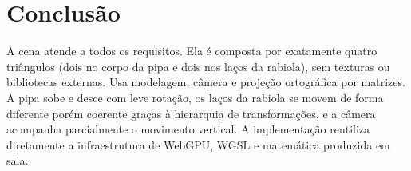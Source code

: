 \documentclass[11pt,a4paper]{article}
\begin{document}
\section{Conclusão}

A cena atende a todos os requisitos. Ela é composta por exatamente quatro
triângulos (dois no corpo da pipa e dois nos laços da rabiola), sem texturas
ou bibliotecas externas. Usa modelagem, câmera e projeção ortográfica por
matrizes. A pipa sobe e desce com leve rotação, os laços da rabiola se movem
de forma diferente porém coerente graças à hierarquia de transformações, e a
câmera acompanha parcialmente o movimento vertical. A implementação reutiliza
diretamente a infraestrutura de WebGPU, WGSL e matemática produzida em sala.
\end{document}

